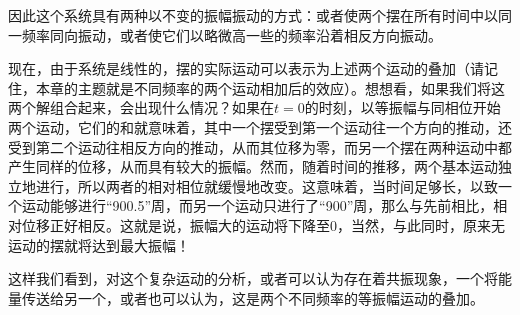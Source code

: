 因此这个系统具有两种以不变的振幅振动的方式：或者使两个摆在所有时间中以同一频率同向振动，或者使它们以略微高一些的频率沿着相反方向振动。

现在，由于系统是线性的，摆的实际运动可以表示为上述两个运动的叠加（请记住，本章的主题就是不同频率的两个运动相加后的效应）。想想看，如果我们将这两个解组合起来，会出现什么情况？如果在$t=0$的时刻，以等振幅与同相位开始两个运动，它们的和就意味着，其中一个摆受到第一个运动往一个方向的推动，还受到第二个运动往相反方向的推动，从而其位移为零，而另一个摆在两种运动中都产生同样的位移，从而具有较大的振幅。然而，随着时间的推移，两个基本运动独立地进行，所以两者的相对相位就缓慢地改变。这意味着，当时间足够长，以致一个运动能够进行“900.5”周，而另一个运动只进行了“900”周，那么与先前相比，相对位移正好相反。这就是说，振幅大的运动将下降至0，当然，与此同时，原来无运动的摆就将达到最大振幅！

这样我们看到，对这个复杂运动的分析，或者可以认为存在着共振现象，一个将能量传送给另一个，或者也可以认为，这是两个不同频率的等振幅运动的叠加。